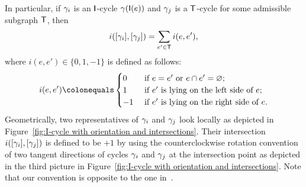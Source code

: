 In particular, if $\gamma_i$ is an $\mathsf{I}$-cycle $\gamma(\mathsf{I}(e))$ and $\gamma_j$ is a $\mathsf{T}$-cycle for some admissible subgraph $\mathsf{T}$, then 
\[
i([\gamma_i], [\gamma_j]) = \sum_{e'\in \mathsf{T}} i(e, e'),
\]
where $i(e,e')\in\{0,1,-1\}$ is defined as follows: 
\[
i(e,e') \colonequals
\begin{cases}
0 & \text{ if }e=e'\text{ or }e\cap e'=\varnothing;\\
1 & \text{ if }e' \text{ is lying on the left side of }e;\\
-1 & \text{ if }e' \text{ is lying on the right side of }e.
\end{cases}
\]
Geometrically, two representatives of $\gamma_i$ and $\gamma_j$ look locally as depicted in Figure~\ref{fig:I-cycle with orientation and intersections}. Their intersection $i([\gamma_i], [\gamma_j])$ is defined to be $+1$ by using the counterclockwise rotation convention of two tangent directions of cycles $\gamma_i$ and $\gamma_j$ at the intersection point as depicted in the third picture in Figure~\ref{fig:I-cycle with orientation and intersections}.
Note that our convention is opposite to the one in~\cite{CZ2020}.

